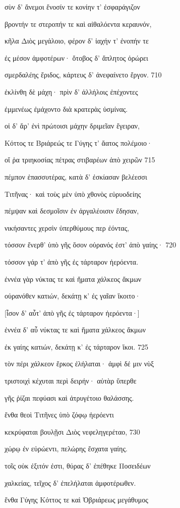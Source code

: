 σὺν δ' ἄνεμοι ἔνοσίν τε κονίην τ' ἐσφαράγιζον

βροντήν τε στεροπήν τε καὶ αἰθαλόεντα κεραυνόν,

κῆλα Διὸς μεγάλοιο, φέρον δ' ἰαχήν τ' ἐνοπήν τε

ἐς μέσον ἀμφοτέρων· ὄτοβος δ' ἄπλητος ὀρώρει 

σμερδαλέης ἔριδος, κάρτευς δ' ἀνεφαίνετο ἔργον. 710

ἐκλίνθη δὲ μάχη· πρὶν δ' ἀλλήλοις ἐπέχοντες 

ἐμμενέως ἐμάχοντο διὰ κρατερὰς ὑσμίνας.

οἱ δ' ἄρ' ἐνὶ πρώτοισι μάχην δριμεῖαν ἔγειραν, 

Κόττος τε Βριάρεώς τε Γύγης τ' ἄατος πολέμοιο·

οἵ ῥα τριηκοσίας πέτρας στιβαρέων ἀπὸ χειρῶν 715 

πέμπον ἐπασσυτέρας, κατὰ δ' ἐσκίασαν βελέεσσι

Τιτῆνας· καὶ τοὺς μὲν ὑπὸ χθονὸς εὐρυοδείης 

πέμψαν καὶ δεσμοῖσιν ἐν ἀργαλέοισιν ἔδησαν,

νικήσαντες χερσὶν ὑπερθύμους περ ἐόντας, 

τόσσον ἔνερθ' ὑπὸ γῆς ὅσον οὐρανός ἐστ' ἀπὸ γαίης· 720 

τόσσον γάρ τ' ἀπὸ γῆς ἐς τάρταρον ἠερόεντα.

ἐννέα γὰρ νύκτας τε καὶ ἤματα χάλκεος ἄκμων

οὐρανόθεν κατιών, δεκάτῃ κ' ἐς γαῖαν ἵκοιτο· 

{[}ἶσον δ' αὖτ' ἀπὸ γῆς ἐς τάρταρον ἠερόεντα·{]}

ἐννέα δ' αὖ νύκτας τε καὶ ἤματα χάλκεος ἄκμων

ἐκ γαίης κατιών, δεκάτῃ κ' ἐς τάρταρον ἵκοι. 725 

τὸν πέρι χάλκεον ἕρκος ἐλήλαται· ἀμφὶ δέ μιν νὺξ 

τριστοιχὶ κέχυται περὶ δειρήν· αὐτὰρ ὕπερθε

γῆς ῥίζαι πεφύασι καὶ ἀτρυγέτοιο θαλάσσης.

ἔνθα θεοὶ Τιτῆνες ὑπὸ ζόφῳ ἠερόεντι

κεκρύφαται βουλῇσι Διὸς νεφεληγερέταο, 730 

χώρῳ ἐν εὐρώεντι, πελώρης ἔσχατα γαίης.

τοῖς οὐκ ἐξιτόν ἐστι, θύρας δ' ἐπέθηκε Ποσειδέων 

χαλκείας, τεῖχος δ' ἐπελήλαται ἀμφοτέρωθεν.

ἔνθα Γύγης Κόττος τε καὶ Ὀβριάρεως μεγάθυμος 

